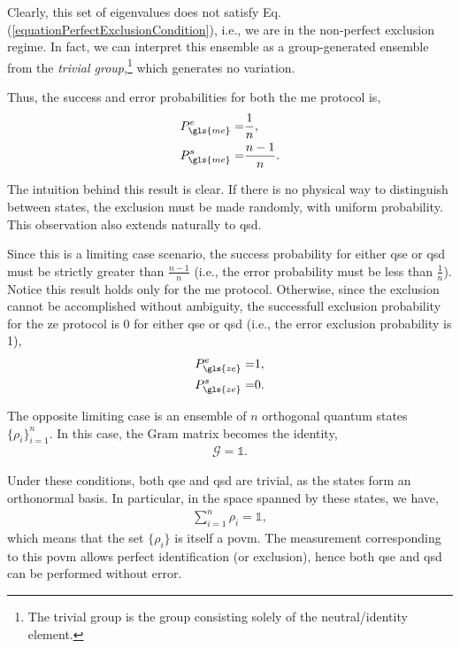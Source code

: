\documentclass[12pt,letterpaper]{article}
\begin{document}
\begin{multicols}{2}
Clearly, this set of eigenvalues does not satisfy Eq. (\ref{equationPerfectExclusionCondition}), i.e., we are in the non-perfect exclusion regime. In fact, we can interpret this ensemble as a group-generated ensemble from the \emph{trivial group},\footnote{The trivial group is the group consisting solely of the neutral/identity element.} which generates no variation.

Thus, the success and error probabilities for both the \gls{me} protocol is,
\begin{align*}
	P_{\gls{me}}^e =& \frac{1}{n},\\
	P_{\gls{me}}^s =& \frac{n-1}{n}.
\end{align*}

The intuition behind this result is clear. If there is no physical way to distinguish between states, the exclusion must be made randomly, with uniform probability. This observation also extends naturally to \gls{qsd}.

Since this is a limiting case scenario, the success probability for either \gls{qse} or \gls{qsd} must be strictly greater than $\frac{n-1}{n}$ (i.e., the error probability must be less than $\frac{1}{n}$). Notice this result holds only for the \gls{me} protocol. Otherwise, since the exclusion cannot be accomplished without ambiguity, the successfull exclusion probability for the \gls{ze} protocol is 0 for either \gls{qse} or \gls{qsd} (i.e., the error exclusion probability is 1), 
\begin{align*}
	P_{\gls{ze}}^e =& 1,\\
	P_{\gls{ze}}^s =& 0.
\end{align*}

The opposite limiting case is an ensemble of $n$ orthogonal quantum states $\{\rho_i\}_{i=1}^{n}$. In this case, the Gram matrix becomes the identity,
\begin{align*}
	\mathcal{G} = \mathds{1}.
\end{align*}

Under these conditions, both \gls{qse} and \gls{qsd} are trivial, as the states form an orthonormal basis. In particular, in the space spanned by these states, we have,
\begin{align*}
	\sum_{i=1}^{n} \rho_i = \mathds{1},
\end{align*}
which means that the set $\{\rho_i\}$ is itself a \gls{povm}. The measurement corresponding to this \gls{povm} allows perfect identification (or exclusion), hence both \gls{qse} and \gls{qsd} can be performed without error.


\end{multicols}
\end{document}
